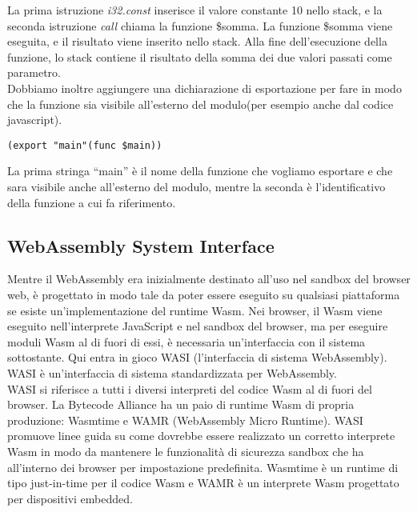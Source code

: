 \documentclass[../../main.tex]{subfiles}
\begin{document}
La prima istruzione \textit{i32.const} inserisce il valore constante 10 nello stack, e la seconda istruzione \textit{call} chiama la funzione \$somma. La funzione \$somma viene eseguita, e il risultato viene inserito nello stack. Alla fine dell'esecuzione della funzione, lo stack contiene il risultato della somma dei due valori passati come parametro.\\
Dobbiamo inoltre aggiungere una dichiarazione di esportazione per fare in modo che la funzione sia visibile all'esterno del modulo(per esempio anche dal codice javascript).
\begin{lstlisting}[language=WebAssembly]
    (export "main"(func $main))
\end{lstlisting}
La prima stringa ``main'' è il nome della funzione che vogliamo esportare e che sara visibile anche all'esterno del modulo, mentre la seconda è l'identificativo della funzione a cui fa riferimento.

\subsection{WebAssembly System Interface}
Mentre il WebAssembly era inizialmente destinato all'uso nel sandbox del browser web, è progettato in modo tale da poter essere eseguito su qualsiasi piattaforma se esiste un'implementazione del runtime Wasm. Nei browser, il Wasm viene eseguito nell'interprete JavaScript e nel sandbox del browser, ma per eseguire moduli Wasm al di fuori di essi, è necessaria un'interfaccia con il sistema sottostante. Qui entra in gioco WASI (l'interfaccia di sistema WebAssembly).\\
WASI è un'interfaccia di sistema standardizzata per WebAssembly.\\
WASI si riferisce a tutti i diversi interpreti del codice Wasm al di fuori del browser. La Bytecode Alliance ha un paio di runtime Wasm di propria produzione: Wasmtime e WAMR (WebAssembly Micro Runtime). WASI promuove linee guida su come dovrebbe essere realizzato un corretto interprete Wasm in modo da mantenere le funzionalità di sicurezza sandbox che ha all'interno dei browser per impostazione predefinita. Wasmtime è un runtime di tipo just-in-time per il codice Wasm e WAMR è un interprete Wasm progettato per dispositivi embedded.\autocite{niemela2021webassembly}
\end{document}
